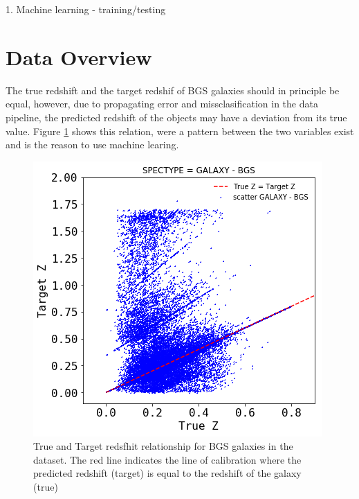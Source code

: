 \documentclass[]{article}
\begin{document}
1. Machine learning - training/testing 

\section{Data Overview}

The true redshift and the target redshif of BGS galaxies should in principle be equal, however, due to propagating error and missclasification in the data pipeline, the predicted redshift of the objects may have a deviation from its true value. Figure \ref{fig:bgs-z-truez} shows this relation, were a pattern between the two variables exist and is the reason to use machine learing. 
\begin{figure}[h!]
	\centering
	\includegraphics[width=0.7\linewidth]{TeX_files/Imagenes/BGS-z-truez}
	\caption{True and Target redsfhit relationship for BGS galaxies in the dataset. The red line indicates the line of calibration where the predicted redshift (target) is equal to the redshift of the galaxy (true) }
	\label{fig:bgs-z-truez}
\end{figure}
\end{document}
